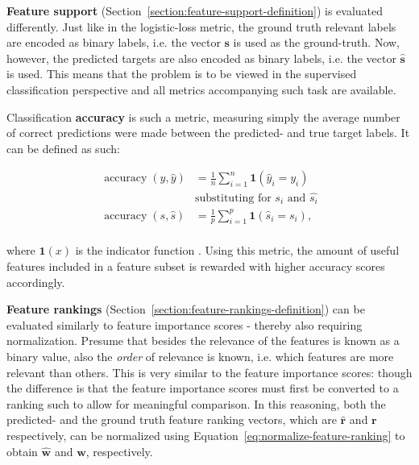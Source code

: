 \documentclass[../main.tex]{subfiles}
\begin{document}
\textbf{Feature support} (Section~\ref{section:feature-support-definition}) is evaluated differently. Just like in the logistic-loss metric, the ground truth relevant labels are encoded as binary labels, i.e. the vector $\boldsymbol{s}$ is used as the ground-truth. Now, however, the predicted targets are also encoded as binary labels, i.e. the vector $\hat{\boldsymbol{s}}$ is used. This means that the problem is to be viewed in the supervised classification perspective and all metrics accompanying such task are available.

Classification \textbf{accuracy} is such a metric, measuring simply the average number of correct predictions were made between the predicted- and true target labels. It can be defined as such:

\begin{equation}
\begin{aligned}
\operatorname{accuracy}(y, \hat{y}) &= \frac{1}{n} \sum_{i=1}^{n} \boldsymbol{1} \left(\hat{y}_{i}=y_{i}\right) \\
&\text{substituting for } s_i \text{ and } \hat{s_i}\\
\operatorname{accuracy}(s, \hat{s}) &= \frac{1}{p} \sum_{i=1}^{p} \boldsymbol{1} \left(\hat{s}_{i}=s_{i}\right), \\
\end{aligned}
\end{equation}

where $\boldsymbol{1}(x)$ is the indicator function \citep{davis_undecidable_2004}. Using this metric, the amount of useful features included in a feature subset is rewarded with higher accuracy scores accordingly.

\textbf{Feature rankings} (Section~\ref{section:feature-rankings-definition}) can be evaluated similarly to feature importance scores - thereby also requiring normalization. Presume that besides the relevance of the features is known as a binary value, also the \textit{order} of relevance is known, i.e. which features are more relevant than others. This is very similar to the feature importance scores: though the difference is that the feature importance scores must first be converted to a ranking such to allow for meaningful comparison. In this reasoning, both the predicted- and the ground truth feature ranking vectors, which are $\hat{\boldsymbol{r}}$ and $\boldsymbol{r}$ respectively, can be normalized using Equation~\ref{eq:normalize-feature-ranking} to obtain $\hat{\boldsymbol{w}}$ and $\boldsymbol{w}$, respectively.
\end{document}

